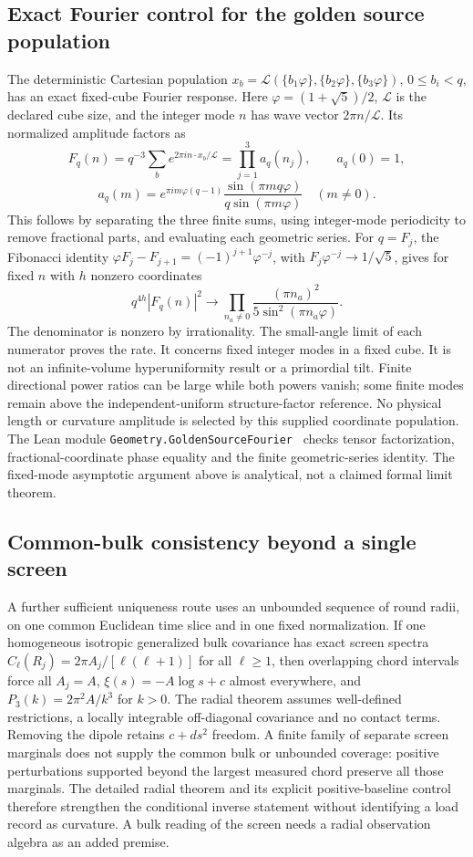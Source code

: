\documentclass[11pt]{article}
\theoremstyle{remark}
\begin{document}
\subsection{Exact Fourier control for the golden source population}
The deterministic Cartesian population
\(x_b=\mathcal L(\{b_1\varphi\},\{b_2\varphi\},\{b_3\varphi\})\),
\(0\le b_i<q\), has an exact fixed-cube Fourier response. Here
\(\varphi=(1+\sqrt5)/2\), \(\mathcal L\) is the declared cube size,
and the integer mode \(n\) has wave vector \(2\pi n/\mathcal L\).
Its normalized amplitude factors as
\[
 F_q(n)=q^{-3}\sum_b e^{2\pi i n\cdot x_b/\mathcal L}
       =\prod_{j=1}^3 a_q(n_j),\qquad a_q(0)=1,
\]
\[
 a_q(m)=e^{\pi i m\varphi(q-1)}
       \frac{\sin(\pi mq\varphi)}{q\sin(\pi m\varphi)}
       \quad(m\ne0).
\]
This follows by separating the three finite sums, using integer-mode
periodicity to remove fractional parts, and evaluating each geometric
series. For \(q=F_j\), the Fibonacci identity
\(\varphi F_j-F_{j+1}=(-1)^{j+1}\varphi^{-j}\), with
\(F_j\varphi^{-j}\to1/\sqrt5\), gives for fixed \(n\)
with \(h\) nonzero coordinates
\[
 q^{4h}|F_q(n)|^2\longrightarrow
 \prod_{n_a\ne0}\frac{(\pi n_a)^2}{5\sin^2(\pi n_a\varphi)}.
\]
The denominator is nonzero by irrationality. The small-angle limit of
each numerator proves the rate. It concerns fixed integer modes in a
fixed cube. It is not an infinite-volume hyperuniformity result or a
primordial tilt. Finite directional power ratios can be large while both
powers vanish; some finite modes remain above the independent-uniform
structure-factor reference. No physical length or curvature
amplitude is selected by this supplied coordinate population. The Lean
module \texttt{Geometry.GoldenSourceFourier}~\cite{ophlean} checks tensor
factorization, fractional-coordinate phase equality and the finite
geometric-series identity. The fixed-mode asymptotic argument above is
analytical, not a claimed formal limit theorem.

\subsection{Common-bulk consistency beyond a single screen}
A further sufficient uniqueness route uses an unbounded sequence of round
radii, on one common Euclidean time slice and in one fixed normalization.
If one homogeneous isotropic generalized bulk covariance has exact screen
spectra \(C_\ell(R_j)=2\pi A_j/[\ell(\ell+1)]\) for all \(\ell\ge1\),
then overlapping chord intervals force all \(A_j=A\),
\(\xi(s)=-A\log s+c\) almost everywhere, and
\(P_3(k)=2\pi^2A/k^3\) for \(k>0\).
The radial theorem assumes well-defined restrictions, a locally integrable
off-diagonal covariance and no contact terms. Removing the dipole retains
\(c+ds^2\) freedom. A finite family of separate screen marginals does
not supply the common bulk or unbounded coverage: positive perturbations
supported beyond the largest measured chord preserve all those marginals.
The detailed radial theorem and its explicit positive-baseline control
therefore strengthen the conditional inverse statement without identifying
a load record as curvature. A bulk reading of the screen needs a radial
observation algebra as an added premise.
\end{document}
